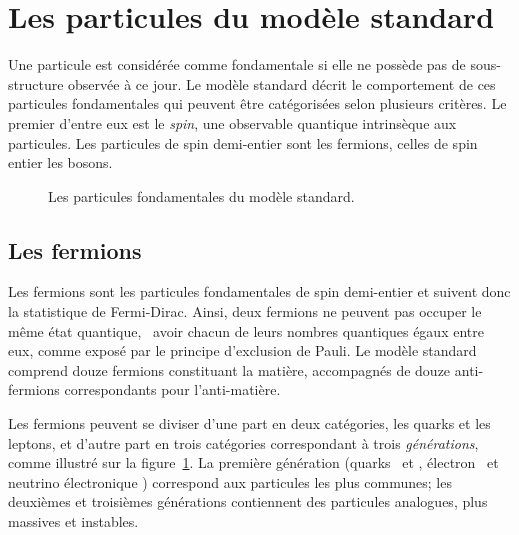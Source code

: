 \section{Les particules du modèle standard}\label{chapter-MS-MSSM-section-SM_ptcs}
Une particule est considérée comme fondamentale si elle ne possède pas de sous-structure observée à ce jour. %
Le modèle standard décrit le comportement de ces particules fondamentales qui peuvent être catégorisées selon plusieurs critères.
Le premier d'entre eux est le \emph{spin}, une observable quantique intrinsèque aux particules.
Les particules de spin demi-entier sont les fermions, celles de spin entier les bosons.
\begin{figure}[h]
\centering
\ifdefined\homedir \else {}\fi
{}
\caption{Les particules fondamentales du modèle standard.}
\label{fig-MS-table}
\end{figure}

\subsection{Les fermions}\label{chapter-MS-MSSM-section-SM_ptcs-subsec-fermions}
Les fermions sont les particules fondamentales de spin demi-entier et suivent donc la statistique de Fermi-Dirac.
Ainsi, deux fermions ne peuvent pas occuper le même état quantique, \ie\ avoir chacun de leurs nombres quantiques égaux entre eux, comme exposé par le principe d'exclusion de Pauli.
Le modèle standard comprend douze fermions constituant la matière, accompagnés de douze anti-fermions correspondants pour l'anti-matière.
\par Les fermions peuvent se diviser d'une part en deux catégories, les quarks et les leptons, et d'autre part en trois catégories correspondant à trois \emph{générations}, comme illustré sur la figure~\ref{fig-MS-table}. La première génération (quarks \quarku\ et \quarkd, électron \electron\ et neutrino électronique \nuele) correspond aux particules les plus communes; les deuxièmes et troisièmes générations contiennent des particules analogues, plus massives et instables.

